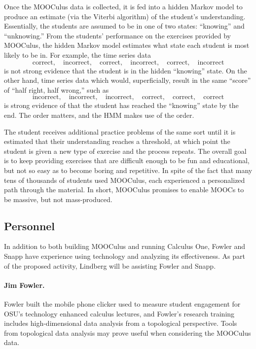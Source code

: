\documentclass[12pt]{article}
\begin{document}
Once the MOOCulus data is collected, it is fed into a hidden Markov
model to produce an estimate (via the Viterbi algorithm) of the student's
understanding. Essentially, the students are assumed to be in one of
two states: ``knowing'' and ``unknowing.''  From the students'
performance on the exercises provided by MOOCulus, the hidden Markov
model estimates what state each student is most likely to be in.  For example, the time series data
$$
\mbox{correct},\quad\mbox{incorrect},\quad\mbox{correct},\quad\mbox{incorrect},\quad\mbox{correct},\quad\mbox{incorrect}
$$
is not strong evidence that the student is in the hidden ``knowing''
state.  On the other hand, time series data which would,
superficially, result in the same ``score'' of ``half right, half wrong,'' such as
$$
\mbox{incorrect},\quad\mbox{incorrect},\quad\mbox{incorrect},\quad\mbox{correct},\quad\mbox{correct},\quad\mbox{correct}
$$
is strong evidence of that the student has reached the ``knowing''
state by the end.  The order matters, and the HMM makes use of the order.

The student receives additional practice problems of the same sort
until it is estimated that their understanding reaches a threshold, at
which point the student is given a new type of exercise and the
process repeats.  The overall goal is to keep providing exercises that
are difficult enough to be fun and educational, but not so easy as to
become boring and repetitive.  In spite of the fact that many tens of
thousands of students used MOOCulus, each experienced a personalized
path through the material.  In short, MOOCulus promises to enable
MOOCs to be massive, but not mass-produced.

\subsection*{Personnel}

In addition to both building MOOCulus and running Calculus One, Fowler
and Snapp have experience using technology and analyzing its
effectiveness.  As part of the proposed activity, Lindberg will be
assisting Fowler and Snapp.

\paragraph*{Jim Fowler.} Fowler built the mobile phone
clicker used to measure student engagement for OSU's technology
enhanced calculus lectures, and Fowler's research training includes
high-dimensional data analysis from a topological perspective.  Tools from topological data analysis may prove useful when considering the MOOCulus data.
\end{document}
